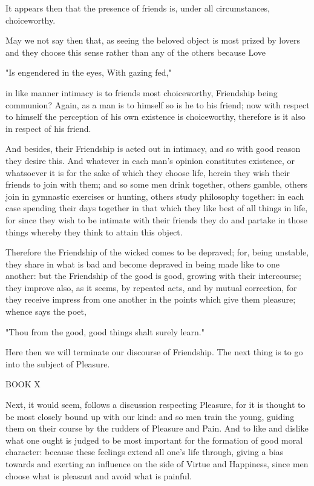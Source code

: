 It appears then that the presence of friends is, under all
circumstances, choiceworthy.

May we not say then that, as seeing the beloved object is most prized by
lovers and they choose this sense rather than any of the others because
Love

  "Is engendered in the eyes,
  With gazing fed,"

in like manner intimacy is to friends most choiceworthy, Friendship
being communion? Again, as a man is to himself so is he to his friend;
now with respect to himself the perception of his own existence is
choiceworthy, therefore is it also in respect of his friend.

And besides, their Friendship is acted out in intimacy, and so with good
reason they desire this. And whatever in each man's opinion constitutes
existence, or whatsoever it is for the sake of which they choose life,
herein they wish their friends to join with them; and so some men drink
together, others gamble, others join in gymnastic exercises or hunting,
others study philosophy together: in each case spending their days
together in that which they like best of all things in life, for since
they wish to be intimate with their friends they do and partake in those
things whereby they think to attain this object.

Therefore the Friendship of the wicked comes to be depraved; for, being
unstable, they share in what is bad and become depraved in being made
like to one another: but the Friendship of the good is good, growing
with their intercourse; they improve also, as it seems, by repeated
acts, and by mutual correction, for they receive impress from one
another in the points which give them pleasure; whence says the poet,

  "Thou from the good, good things shalt surely learn."

Here then we will terminate our discourse of Friendship. The next thing
is to go into the subject of Pleasure.




BOOK X


Next, it would seem, follows a discussion respecting Pleasure, for it is
thought to be most closely bound up with our kind: and so men train the
young, guiding them on their course by the rudders of Pleasure and Pain.
And to like and dislike what one ought is judged to be most important
for the formation of good moral character: because these feelings extend
all one's life through, giving a bias towards and exerting an influence
on the side of Virtue and Happiness, since men choose what is pleasant
and avoid what is painful.

